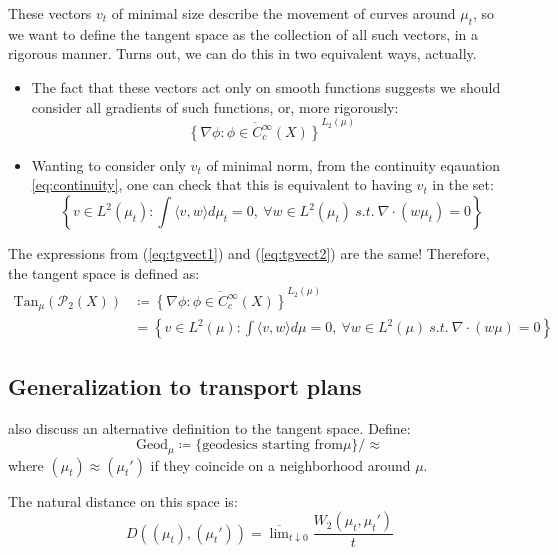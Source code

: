 \documentclass{article}
\begin{document}
These vectors $v_t$ of minimal size describe the movement of curves 
around $\mu_t$, so we want to define the tangent space as the collection 
of all such vectors, in a rigorous manner. Turns out, we can do this 
in two equivalent ways, actually.
\begin{itemize}
    \item The fact that these vectors act only on smooth functions suggests
    we should consider all gradients of such functions, or, more rigorously:
    \begin{equation}
        \label{eq:tgvect1}
        \overline{\left\{\nabla \phi : \phi\in C^\infty_c(X) \right\}}^{L_2(\mu)}
    \end{equation}
    \item Wanting to consider only $v_t$ of minimal norm, from the continuity
    eqauation \ref{eq:continuity}, one can check that this is equivalent to 
    having $v_t$ in the set:
    \begin{equation}
        \label{eq:tgvect2}
        \left\{v\in L^2(\mu_t) : \int\langle v,w\rangle d\mu_t = 0,\ \forall w \in L^2(\mu_t)\ s.t.\ \nabla\cdot(w\mu_t) = 0\right\}
    \end{equation}
\end{itemize}

The expressions from (\ref{eq:tgvect1}) and (\ref{eq:tgvect2}) are the same!
Therefore, the tangent space is defined as:
\begin{align*}
    \label{eq:tgvect}
    \text{Tan}_\mu(\mathscr{P}_2(X))&\coloneqq \overline{\left\{\nabla \phi : \phi\in C^\infty_c(X) \right\}}^{L_2(\mu)} \\
    &= \left\{v\in L^2(\mu) : \int\langle v,w\rangle d\mu = 0,\ \forall w \in L^2(\mu)\ s.t.\ \nabla\cdot(w\mu) = 0\right\}
\end{align*}

\subsection{Generalization to transport plans}

\cite{ambgigli2011} also discuss an alternative definition to the tangent space.
Define: 
\[\text{Geod}_\mu \coloneqq \{\text{geodesics starting from} \mu\}/\approx \]
where $(\mu_t)\approx (\mu_t')$ if they coincide on a neighborhood around $\mu$.

The natural distance on this space is:
\[D((\mu_t), (\mu_t')) = \overline{\lim}_{t\downarrow 0} \frac{W_2(\mu_t, \mu_t')}{t}\]
\end{document}
